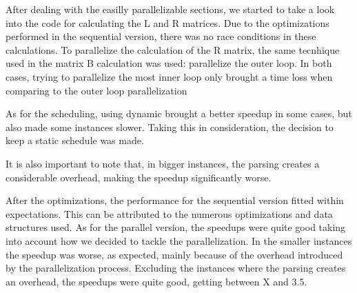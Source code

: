 \documentclass[a4paper]{article}
\begin{document}
After dealing with the easilly parallelizable sections, we started to take a look
into the code for calculating the L and R matrices. Due to the optimizations performed in
the sequential version, there was no race conditions in these calculations. %
To parallelize the calculation of the R matrix, the same tecnhique used in the matrix B 
calculation was used: parallelize the outer loop. In both cases, trying to parallelize
the most inner loop only brought a time loss when comparing to the outer loop parallelization


As for the scheduling, using dynamic brought a better speedup in some cases, but also made
some instances slower. Taking this in consideration, the decision to keep a static schedule
was made. %


It is also important to note that, in bigger instances, the parsing creates a considerable 
overhead, making the speedup significantly worse.

After the optimizations, the performance for the sequential version fitted within 
expectations. This can be attributed to the numerous optimizations and data structures used.
As for the parallel version, the speedups were quite good taking into account how we decided 
to tackle the parallelization. In the smaller instances the speedup was worse, as expected,
mainly because of the overhead introduced by the parallelization process. Excluding the 
instances where the parsing creates an overhead, the speedups were quite good, getting between X %
and 3.5.


\end{document}
